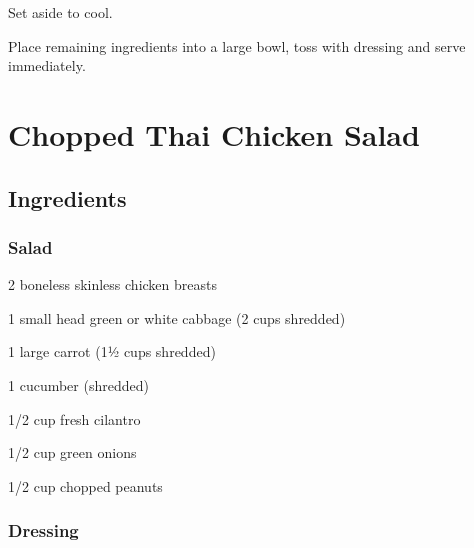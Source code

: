 \documentclass[ansiapaper,10pt,english]{sphinxmanual}
\begin{document}
Set aside to cool.

Place remaining ingredients into a large bowl, toss with dressing and serve immediately.


\chapter{Chopped Thai Chicken Salad}
\label{\detokenize{Chopped_Thai_Cluck_Salad:chopped-thai-chicken-salad}}\label{\detokenize{Chopped_Thai_Cluck_Salad::doc}}

\section{Ingredients}
\label{\detokenize{Chopped_Thai_Cluck_Salad:ingredients}}

\subsection{Salad}
\label{\detokenize{Chopped_Thai_Cluck_Salad:salad}}
%
\begin{sphinxVerbatim}[commandchars=\\\{\}]
2 boneless skinless chicken breasts

1 small head green or white cabbage (2 cups shredded)

1 large carrot (1½ cups shredded)

1 cucumber (shredded)

1/2 cup fresh cilantro

1/2 cup green onions

1/2 cup chopped peanuts
\end{sphinxVerbatim}


\subsection{Dressing}
\label{\detokenize{Chopped_Thai_Cluck_Salad:dressing}}
%
\begin{sphinxVerbatim}[commandchars=\\\{\}]
  

 

   

  

  

    

  

   

   

  
\end{sphinxVerbatim}
\end{document}
